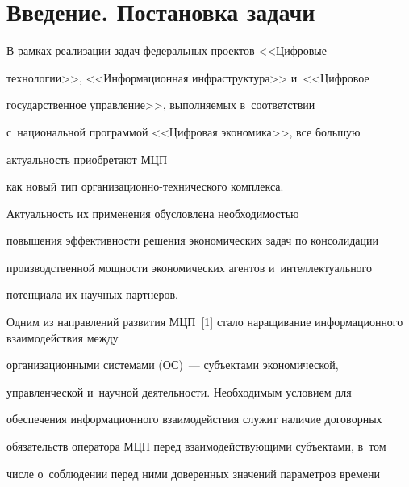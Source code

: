 


 \thispagestyle{headings}

 

 \vspace*{-18pt}

 



\section{Введение. Постановка задачи}



\vspace*{-2pt}



  В рамках реализации задач федеральных проектов <<Циф\-ро\-вые 

технологии>>, <<Информационная инфраструктура>> и~<<Циф\-ро\-вое 

государственное управ\-ле\-ние>>, вы\-пол\-ня\-емых в~соответствии 

с~национальной программой <<Циф\-ро\-вая экономика>>, все большую 

ак\-ту\-аль\-ность приобретают МЦП 

как новый тип ор\-га\-ни\-за\-ци\-он\-но-тех\-ни\-че\-ско\-го комплекса.  

Ак\-ту\-аль\-ность их применения обуслов\-ле\-на не\-об\-хо\-ди\-мостью 

повышения эффективности решения экономических задач по консолидации 

производственной мощ\-ности экономических агентов и~интеллектуального 

потенциала их научных партнеров. 

  

  Одним из направлений развития МЦП~[1] стало наращивание информационного взаимодействия между 

организационными системами (ОС)~--- субъектами экономической, 

управ\-лен\-че\-ской и~на\-уч\-ной дея\-тель\-ности. Необходимым условием для 

обеспечения информационного взаимодействия служит наличие договорных 

обязательств оператора МЦП перед вза\-и\-мо\-дей\-ст\-ву\-ющи\-ми субъектами, в~том 

чис\-ле о~соблюдении перед ними доверенных значений па\-ра\-мет\-ров времени 

